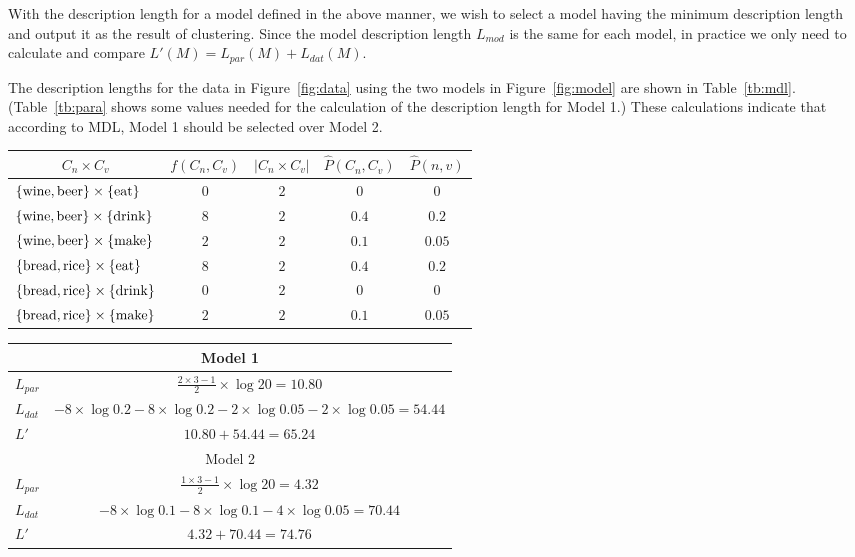  With the description length for a model defined in the above manner,
 we wish to select a model having the minimum description length and
 output it as the result of clustering. Since the model description
 length $L_{mod}$ is the same for each model, in practice we only need
 to calculate and compare $L'(M) = L_{par}(M) + L_{dat}(M)$.

 The description lengths for the data in Figure~\ref{fig:data} using
 the two models in Figure~\ref{fig:model} are shown in
 Table~\ref{tb:mdl}. (Table~\ref{tb:para} shows some values needed for
 the calculation of the description length for Model 1.) These
 calculations indicate that according to MDL, Model 1 should be
 selected over Model 2.

\begin{table*}[htb] \caption{Estimating parameters of Model 1} 
\label{tb:para}
\begin{center} \begin{tabular}{|l|c|c|c|c|} \hline
\multicolumn{1}{|c|}{$C_n \times C_v$} & $f(C_n,C_v)$ & $|C_n \times
C_v|$ & $\hat{P}(C_n,C_v)$ & $\hat{P}(n,v)$ \\ \hline
$\{{\rm wine},{\rm beer}\}\times \{{\rm eat}\}$ & $0$ & $2$ & $0$ & $0$ \\
$\{{\rm wine},{\rm beer}\}\times \{{\rm drink}\}$ & $8$ & $2$ & $0.4$ & $0.2$ \\
$\{{\rm wine},{\rm beer}\}\times \{{\rm make}\}$ & $2$ & $2$ & $0.1$ & $0.05$ \\
$\{{\rm bread},{\rm rice}\}\times \{{\rm eat}\}$ & $8$ & $2$ & $0.4$ & $0.2$ \\
$\{{\rm bread},{\rm rice}\}\times \{{\rm drink}\}$ & $0$ & $2$ & $0$ & $0$ \\
$\{{\rm bread},{\rm rice}\}\times \{{\rm make}\}$ & $2$ & $2$ & $0.1$ & $0.05$ \\ \hline
\end{tabular} \end{center} \end{table*}

\begin{table*}[htb]
\caption{Description length for the models}
\label{tb:mdl}
\begin{center}
\begin{tabular}{|l|c|} \hline
\multicolumn{2}{|c|}{Model 1} \\ \hline
$L_{par}$ & $\frac{2\times 3-1}{2}\times \log 20 =10.80$ \\
$L_{dat}$ & $-8\times \log0.2-8\times\log 0.2-2\times \log 0.05-2
\times \log 0.05=54.44$ \\
$L'$ & $10.80+54.44=65.24$ \\ \hline
\multicolumn{2}{|c|}{Model 2} \\ \hline
$L_{par}$ & $\frac{1\times 3-1}{2}\times\log 20 =4.32$ \\
$L_{dat}$ & $-8\times \log0.1-8\times\log 0.1-4 \times \log 0.05=70.44$ \\
$L'$ & $4.32+70.44=74.76$ \\ \hline
\end{tabular}
\end{center}
\end{table*}

